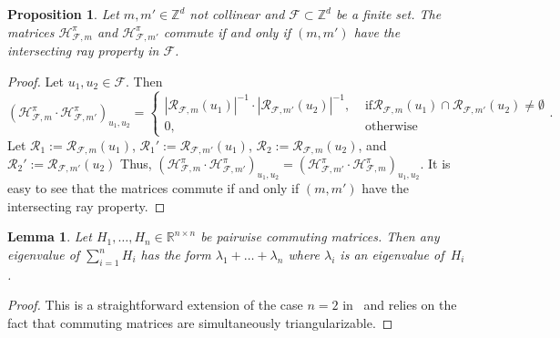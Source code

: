 \documentclass[11pt]{amsart}
\newtheorem{lemma}[thm]{Lemma}
\newtheorem{prop}[thm]{Proposition}
\theoremstyle{definition}
\numberwithin{equation}{section}
\newcommand{\ring}[1]{\ensuremath{\mathbb{#1}}}
\renewcommand{\>}{\rangle}
\newcommand{\<}{\langle}
\newcommand{\0}{\mathbf{0}}
\newcommand{\1}{\mathbf{1}}
\newcommand{\2}{\mathbf{2}}
\newcommand\RR{\ring{R}}
\newcommand\ZZ{\ring{Z}}
\newcommand\cF{{\mathcal F}}
\newcommand\cR{{\mathcal R}}
\newcommand{\polyray}[3]{\mathcal{R}_{#3,#2}(#1)}
\newcommand{\heatbathmove}[3]{\mathcal{H}^{#1}_{#2,#3}}
\begin{document}
\begin{prop}\label{p:CommutingMoveMatrices}
Let $m,m'\in\ZZ^d$ not collinear and $\cF\subset\ZZ^d$ be a finite set. The
matrices $\heatbathmove{\pi}{\cF}{m}$ and $\heatbathmove{\pi}{\cF}{m'}$
commute if and only if $(m,m')$ have the intersecting ray property in
$\cF$.
\end{prop}
\begin{proof}
Let $u_1,u_2\in\cF$. Then 
\begin{equation*}
(\heatbathmove{\pi}{\cF}{m}\cdot\heatbathmove{\pi}{\cF}{m'})_{u_1,u_2}=
\begin{cases}
|\polyray{u_1}{m}{\cF}|^{-1}\cdot|\polyray{u_2}{m'}{\cF}|^{-1},&\text{ if
}\polyray{u_1}{m}{\cF}\cap\polyray{u_2}{m'}{\cF}\neq\emptyset\\
0,&\text{ otherwise}
\end{cases}.
\end{equation*}
Let $\cR_1:=\polyray{u_1}{m}{\cF}$, $\cR_1':=\polyray{u_1}{m'}{\cF}$,
$\cR_2:=\polyray{u_2}{m}{\cF}$, and $\cR_2':=\polyray{u_2}{m'}{\cF}$
Thus,
$(\heatbathmove{\pi}{\cF}{m}\cdot\heatbathmove{\pi}{\cF}{m'})_{u_1,u_2}=(\heatbathmove{\pi}{\cF}{m'}\cdot\heatbathmove{\pi}{\cF}{m})_{u_1,u_2}$.
It is easy to see that the matrices commute if and only if $(m,m')$
have the intersecting ray property.
\end{proof}

\begin{lemma}\label{l:DiagonizableCommutingMatrices}
Let $H_1,\dots,H_n\in\RR^{n\times n}$ be pairwise
commuting matrices. Then any eigenvalue of $\sum_{i=1}^nH_i$ has the
form $\lambda_1+\dots+\lambda_n$ where $\lambda_i$ is an eigenvalue
of~$H_i$.
\end{lemma}
\begin{proof}
This is a straightforward extension of the case $n=2$
in~\cite[Theorem~2.4.8.1]{Horn2013} and relies on the fact that
commuting matrices are simultaneously triangularizable.
\end{proof}
\end{document}
